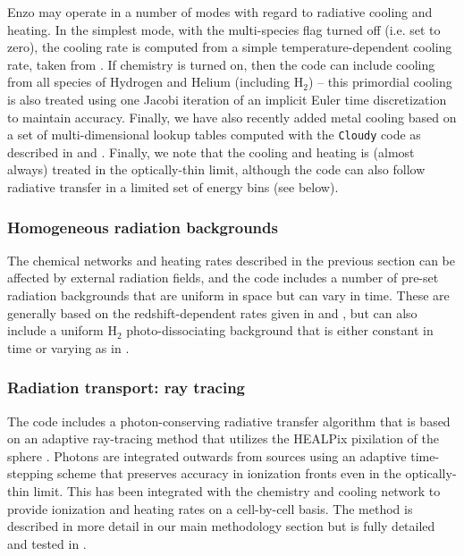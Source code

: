 Enzo may operate in a number of modes with regard to radiative cooling
and heating.  In the simplest mode, with the multi-species flag turned
off (i.e. set to zero), the cooling rate is computed from a simple
temperature-dependent cooling rate, taken from \citet{SW87}.  If
chemistry is turned on, then the code can include cooling from all
species of Hydrogen and Helium (including H$_2$) -- this primordial cooling is
also treated using 
one Jacobi iteration of an implicit Euler time discretization to maintain accuracy.  Finally, we have also recently
added metal cooling based on a set of multi-dimensional lookup tables
computed with the \texttt{Cloudy} code \citep{1998PASP..110..761F} as
described in \citet{2008MNRAS.385.1443S} and
\citet{2011ApJ...731....6S}.  Finally, we note that the cooling and
heating is (almost always) treated in the optically-thin limit,
although the code can also follow radiative transfer in a limited set
of energy bins (see below).

\subsubsection{Homogeneous radiation backgrounds}

The chemical networks and heating rates described in the previous
section can be affected by external radiation fields, and the code
includes a number of pre-set radiation backgrounds that are uniform in
space but can vary in time.  These are generally based on the
redshift-dependent rates given in \citet{1996ApJ...461...20H} and
\citet{2012ApJ...746..125H}, but can also include a uniform H$_2$
photo-dissociating background that is either constant in time or
varying as in \citet{WiseAbel05}.

\subsubsection{Radiation transport: ray tracing}

The code includes a photon-conserving radiative transfer algorithm
that is based on an adaptive ray-tracing method that utilizes the
HEALPix pixilation of the sphere \citep{AbelWandelt02}.  Photons are
integrated outwards from sources using an adaptive time-stepping
scheme that preserves accuracy in ionization fronts even in the
optically-thin limit.  This has been integrated with the chemistry and
cooling network to provide ionization and heating rates on a
cell-by-cell basis.  The method is described in more detail in our
main methodology section but is fully detailed and tested in
\citet{Wise11_Moray}.

